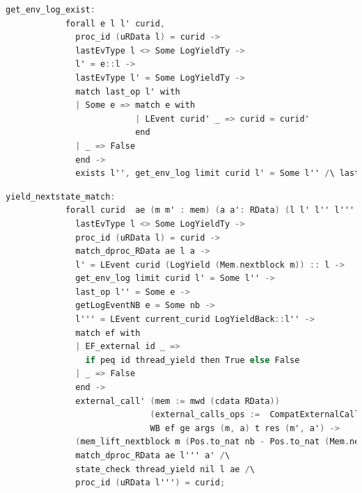 \begin{lstlisting}[language=C]
          get_env_log_exist: 
            forall e l l' curid, 
              proc_id (uRData l) = curid ->
              lastEvType l <> Some LogYieldTy ->
              l' = e::l ->
              lastEvType l' = Some LogYieldTy ->
              match last_op l' with
              | Some e => match e with 
                          | LEvent curid' _ => curid = curid'
                          end
              | _ => False
              end ->
              exists l'', get_env_log limit curid l' = Some l'' /\ lastEvType l'' = Some LogYieldTy;
\end{lstlisting}

\begin{lstlisting}[language=C]
          yield_nextstate_match:
            forall curid  ae (m m' : mem) (a a': RData) (l l' l'' l''': Log) e nb WB ef (ge : genv) args m t res,
              lastEvType l <> Some LogYieldTy ->
              proc_id (uRData l) = curid ->
              match_dproc_RData ae l a ->
              l' = LEvent curid (LogYield (Mem.nextblock m)) :: l ->
              get_env_log limit curid l' = Some l'' ->
              last_op l'' = Some e ->
              getLogEventNB e = Some nb -> 
              l''' = LEvent current_curid LogYieldBack::l'' ->
              match ef with 
              | EF_external id _ =>
                if peq id thread_yield then True else False 
              | _ => False
              end ->
              external_call' (mem := mwd (cdata RData)) 
                             (external_calls_ops :=  CompatExternalCalls.compatlayer_extcall_ops (phthread <@$\oplus$@>  L64))
                             WB ef ge args (m, a) t res (m', a') ->
              (mem_lift_nextblock m (Pos.to_nat nb - Pos.to_nat (Mem.nextblock m)) = m') /\
              match_dproc_RData ae l''' a' /\
              state_check thread_yield nil l ae /\
              proc_id (uRData l''') = curid;
\end{lstlisting}


